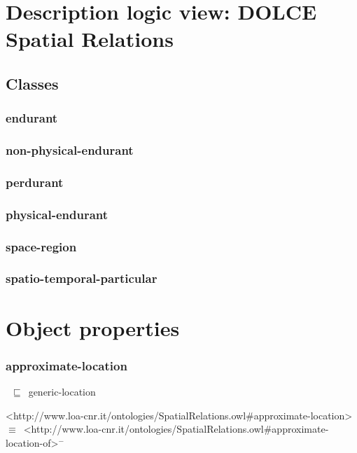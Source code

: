 \documentclass{article}
\begin{document}
\section*{Description logic view: DOLCE Spatial Relations}

\subsection*{Classes}

\subsubsection*{endurant}

\subsubsection*{non-physical-endurant}

\subsubsection*{perdurant}

\subsubsection*{physical-endurant}

\subsubsection*{space-region}

\subsubsection*{spatio-temporal-particular}

\section*{Object properties}\subsubsection*{approximate-location}

~\ensuremath{\sqsubseteq}~generic-location

<http://www.loa-cnr.it/ontologies/SpatialRelations.owl#approximate-location>~\ensuremath{\equiv}~<http://www.loa-cnr.it/ontologies/SpatialRelations.owl#approximate-location-of>\ensuremath{^-}
\end{document}
